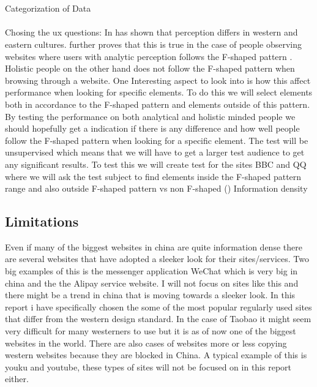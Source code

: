   \\\\
  Categorization of Data
  \\\\
  Chosing the ux questions:
  In \cite{Holistic_vs_Analytic} has shown that perception differs in western and eastern cultures. \cite{cross_web} further proves that this is true in the case of people observing websites where users with analytic perception follows the F-shaped pattern \cite{pernice2014people}. Holistic people on the other hand does not follow the F-shaped pattern when browsing through a website. \cite{cross_web} One Interesting aspect to look into is how this affect performance when looking for specific elements. To do this we will select elements both in accordance to the F-shaped pattern and elements outside of this pattern. By testing the performance on both analytical and holistic minded people we should hopefully get a indication if there is any difference and how well people follow the F-shaped pattern when looking for a specific element. The test will be unsupervised which means that we will have to get a larger test audience to get any significant results. To test this we will create test for the sites BBC and QQ where we will ask the test subject to find elements inside the F-shaped pattern range and also outside
  F-shaped pattern vs non F-shaped (\cite{cross_web})
  Information density
   
 \subsection{Limitations}
 Even if many of the biggest websites in china are quite information dense there are several websites that have adopted a sleeker look for their sites/services. Two big examples of this is the messenger application WeChat which is very big in china and the the Alipay service website. I will not focus on sites like this and there might be a trend in china that is moving towards a sleeker look. In this report i have specifically chosen the some of the most popular regularly used sites that differ from the western design standard. In the case of Taobao it might seem very difficult for many westerners to use but it is as of now one of the biggest websites in the world. There are also cases of websites more or less copying western websites because they are blocked in China. A typical example of this is youku and youtube, these types of sites will not be focused on in this report either.